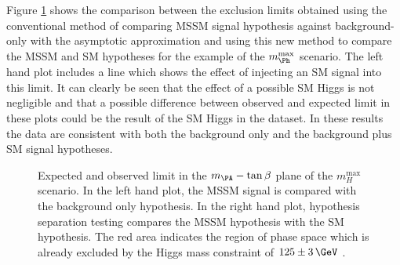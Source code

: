 Figure \ref{fig:hypotestcompare} shows the comparison between the exclusion
limits obtained using the conventional method of comparing \ac{MSSM} signal
hypothesis against background-only with the asymptotic approximation 
and using this new method to compare the
\ac{MSSM} and \ac{SM} hypotheses for the example of the $m_{\Ph}^\text{max}$
scenario. The left hand plot includes a line which shows
the effect of injecting an \ac{SM} signal into this limit. It can clearly be
seen that the effect of a possible \ac{SM} Higgs is not negligible and that a
possible difference between observed and expected limit in these plots could be 
the result of the \ac{SM} Higgs in the dataset. In these results the data are 
consistent with both the background only and the background plus \ac{SM} signal hypotheses.

\begin{figure}[tbh]
\caption[Expected and observed limit in the $m_{\PA}-\tan\beta$ plane of the
$m_H^{\text{max}}$ scenario.]{Expected and observed limit in the $m_{\PA}-\tan\beta$ plane of the
$m_H^{\text{max}}$ scenario. In the left hand plot, the \ac{MSSM} signal is
compared with the background only hypothesis. In the right hand plot, hypothesis
separation testing compares the \ac{MSSM} hypothesis with the SM
hypothesis. The red area indicates the region of phase space which is already
excluded by the Higgs mass constraint of $125\pm3\,\GeV$ \cite{HIG-13-021-twiki,HIG-13-021}.}
\label{fig:hypotestcompare}
\end{figure}


